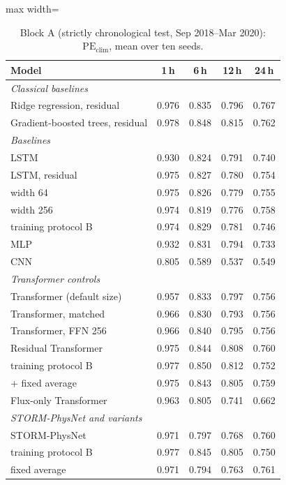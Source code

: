 \begin{table}[!t]
\centering
\caption{Block A (strictly chronological test, Sep 2018--Mar 2020): $\mathrm{PE}_\mathrm{clim}$, mean over ten seeds.}
\label{tab:blockA}
\footnotesize
\setlength{\tabcolsep}{4pt}
\begin{adjustbox}{max width=\linewidth}
\begin{tabular}{lcccc}
\toprule
Model & 1\,h & 6\,h & 12\,h & 24\,h \\
\midrule
\multicolumn{5}{l}{\textit{Classical baselines}} \\
Ridge regression, residual & 0.976 & 0.835 & 0.796 & 0.767 \\
Gradient-boosted trees, residual & 0.978 & 0.848 & 0.815 & 0.762 \\
\multicolumn{5}{l}{\textit{Baselines}} \\
LSTM & 0.930 & 0.824 & 0.791 & 0.740 \\
LSTM, residual & 0.975 & 0.827 & 0.780 & 0.754 \\
\quad width 64 & 0.975 & 0.826 & 0.779 & 0.755 \\
\quad width 256 & 0.974 & 0.819 & 0.776 & 0.758 \\
\quad training protocol B & 0.974 & 0.829 & 0.781 & 0.746 \\
MLP & 0.932 & 0.831 & 0.794 & 0.733 \\
CNN & 0.805 & 0.589 & 0.537 & 0.549 \\
\multicolumn{5}{l}{\textit{Transformer controls}} \\
Transformer (default size) & 0.957 & 0.833 & 0.797 & 0.756 \\
Transformer, matched & 0.966 & 0.830 & 0.793 & 0.756 \\
Transformer, FFN 256 & 0.966 & 0.840 & 0.795 & 0.756 \\
Residual Transformer & 0.975 & 0.844 & 0.808 & 0.760 \\
\quad training protocol B & 0.977 & 0.850 & 0.812 & 0.752 \\
\quad + fixed average & 0.975 & 0.843 & 0.805 & 0.759 \\
Flux-only Transformer & 0.963 & 0.805 & 0.741 & 0.662 \\
\multicolumn{5}{l}{\textit{STORM-PhysNet and variants}} \\
STORM-PhysNet & 0.971 & 0.797 & 0.768 & 0.760 \\
\quad training protocol B & 0.977 & 0.845 & 0.805 & 0.750 \\
\quad fixed average & 0.971 & 0.794 & 0.763 & 0.761 \\

\end{tabular}
\end{adjustbox}
\end{table}

